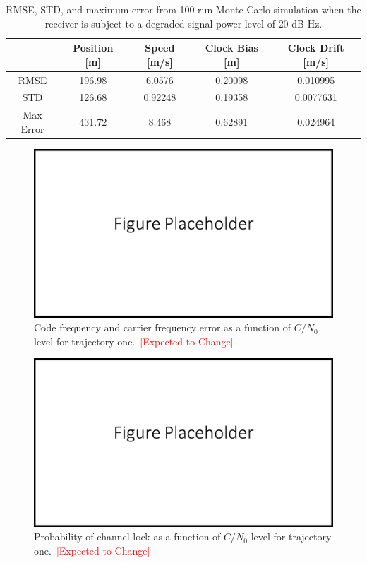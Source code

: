 \begin{table}[!ht]
    \caption{RMSE, STD, and maximum error from 100-run Monte Carlo simulation when the receiver is subject to a degraded signal power level of \(20\) dB-Hz.}\label{tbl:dyn20CV}
    \centering
    \begin{tabular}{ccccc}
        \toprule
                  & Position [m] & Speed [m/s] & Clock Bias [m] & Clock Drift [m/s] \\
        \midrule
        RMSE      & 196.98       & 6.0576      & 0.20098        & 0.010995          \\
        STD       & 126.68       & 0.92248     & 0.19358        & 0.0077631         \\
        Max Error & 431.72       & 8.468       & 0.62891        & 0.024964          \\
        \bottomrule
    \end{tabular}
\end{table}
\begin{figure}[!ht]
    \centering
    \includegraphics[width=\linewidth]{Figures/FigurePlaceholder.png}
    \caption{Code frequency and carrier frequency error as a function of \(C/N_0\) level for trajectory one.~\textcolor{red}{[Expected to Change]}}\label{fig:truecodefreqerrror2}
\end{figure}


\begin{figure}[!ht]
    \centering
    \includegraphics[width=\linewidth]{Figures/FigurePlaceholder.png}
    \caption{Probability of channel lock as a function of \(C/N_0\) level for trajectory one.~\textcolor{red}{[Expected to Change]}}\label{fig:trackingprobability2}
\end{figure}


